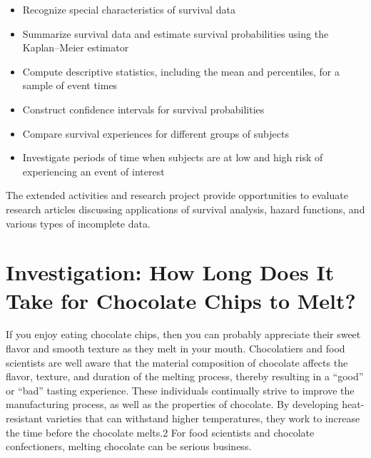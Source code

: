 \documentclass[
]{book}
\providecommand{\tightlist}{%
  \setlength{\itemsep}{0pt}\setlength{\parskip}{0pt}}
\begin{document}
\begin{itemize}
\tightlist
\item
  Recognize special characteristics of survival data\\
\item
  Summarize survival data and estimate survival probabilities using the Kaplan--Meier estimator\\
\item
  Compute descriptive statistics, including the mean and percentiles, for a sample of event times\\
\item
  Construct confidence intervals for survival probabilities\\
\item
  Compare survival experiences for different groups of subjects\\
\item
  Investigate periods of time when subjects are at low and high risk of experiencing an event of interest
\end{itemize}

The extended activities and research project provide opportunities to evaluate research articles discussing applications of survival analysis, hazard functions, and various types of incomplete data.

\hypertarget{investigation-how-long-does-it-take-for-chocolate-chips-to-melt}{%
\section{Investigation: How Long Does It Take for Chocolate Chips to Melt?}\label{investigation-how-long-does-it-take-for-chocolate-chips-to-melt}}

If you enjoy eating chocolate chips, then you can probably appreciate their sweet flavor and smooth texture as they melt in your mouth. Chocolatiers and food scientists are well aware that the material composition of chocolate affects the flavor, texture, and duration of the melting process, thereby resulting in a ``good'' or ``bad'' tasting experience. These individuals continually strive to improve the manufacturing process, as well as the properties of chocolate. By developing heat-resistant varieties that can withstand higher temperatures, they work to increase the time before the chocolate melts.2 For food scientists and chocolate confectioners, melting chocolate can be serious business.
\end{document}

